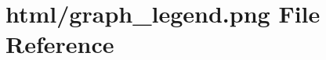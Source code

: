 \hypertarget{graph__legend_8png}{}\section{html/graph\+\_\+legend.png File Reference}
\label{graph__legend_8png}
